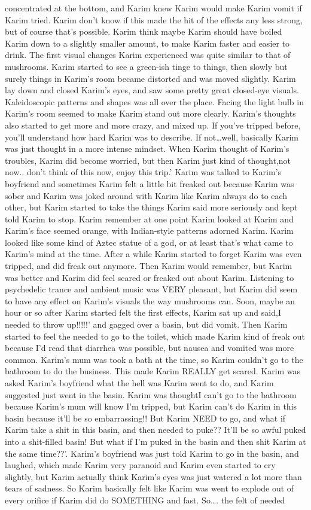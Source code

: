 \documentclass[12pt]{book}
\begin{document}
concentrated at the bottom, and Karim knew Karim would make Karim vomit if Karim tried. Karim don't know if this made the hit of the effects any less strong, but of course that's possible. Karim think maybe Karim should have boiled Karim down to a slightly smaller amount, to make Karim faster and easier to drink. The first visual changes Karim experienced was quite similar to that of mushrooms. Karim started to see a green-ish tinge to things, then slowly but surely things in Karim's room became distorted and was moved slightly. Karim lay down and closed Karim's eyes, and saw some pretty great closed-eye visuals. Kaleidoscopic patterns and shapes was all over the place. Facing the light bulb in Karim's room seemed to make Karim stand out more clearly. Karim's thoughts also started to get more and more crazy, and mixed up. If you've tripped before, you'll understand how hard Karim was to describe. If not\ldots well, basically Karim was just thought in a more intense mindset. When Karim thought of Karim's troubles, Karim did become worried, but then Karim just kind of thought,not now.. don't think of this now, enjoy this trip.' Karim was talked to Karim's boyfriend and sometimes Karim felt a little bit freaked out because Karim was sober and Karim was joked around with Karim like Karim always do to each other, but Karim started to take the things Karim said more seriously and kept told Karim to stop. Karim remember at one point Karim looked at Karim and Karim's face seemed orange, with Indian-style patterns adorned Karim. Karim looked like some kind of Aztec statue of a god, or at least that's what came to Karim's mind at the time. After a while Karim started to forget Karim was even tripped, and did freak out anymore. Then Karim would remember, but Karim was better and Karim did feel scared or freaked out about Karim. Listening to psychedelic trance and ambient music was VERY pleasant, but Karim did seem to have any effect on Karim's visuals the way mushrooms can. Soon, maybe an hour or so after Karim started felt the first effects, Karim sat up and said,I needed to throw up!!!!!' and gagged over a basin, but did vomit. Then Karim started to feel the needed to go to the toilet, which made Karim kind of freak out because I'd read that diarrhea was possible, but nausea and vomited was more common. Karim's mum was took a bath at the time, so Karim couldn't go to the bathroom to do the business. This made Karim REALLY get scared. Karim was asked Karim's boyfriend what the hell was Karim went to do, and Karim suggested just went in the basin. Karim was thoughtI can't go to the bathroom because Karim's mum will know I'm tripped, but Karim can't do Karim in this basin because it'll be so embarrassing!! But Karim NEED to go, and what if Karim take a shit in this basin, and then needed to puke?? It'll be so awful puked into a shit-filled basin! But what if I'm puked in the basin and then shit Karim at the same time??'. Karim's boyfriend was just told Karim to go in the basin, and laughed, which made Karim very paranoid and Karim even started to cry slightly, but Karim actually think Karim's eyes was just watered a lot more than tears of sadness. So Karim basically felt like Karim was went to explode out of every orifice if Karim did do SOMETHING and fast. So\ldots . the felt of needed 
\end{document}
